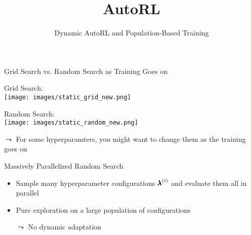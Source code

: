 \documentclass[aspectratio=169]{../latex_main/tntbeamer}  %
\title[AutoRL]{AutoRL}
\subtitle{Dynamic AutoRL and Population-Based Training}
\begin{document}
	
	\maketitle

\begin{frame}[c]{Grid Search vs. Random Search as Training Goes on}
	
\centering
Grid Search:\\
\texttt{[image: images/static\_grid\_new.png]} 

\bigskip
Random Search:\\
\texttt{[image: images/static\_random\_new.png]}

$\leadsto$ For some hyperparamters, you might want to change them as the training goes on
\end{frame}
\begin{frame}[c]{Massively Parallelized Random Search}


\bigskip
\begin{itemize}
	\item Sample many hyperparameter configurations ${\pmb{\lambda}}^{(i)}$ and evaluate them all in parallel
	\pause
	\item Pure exploration on a large population of configurations
	\pause
	\item[$\leadsto$] No dynamic adaptation
\end{itemize}

\end{frame}
\end{document}
